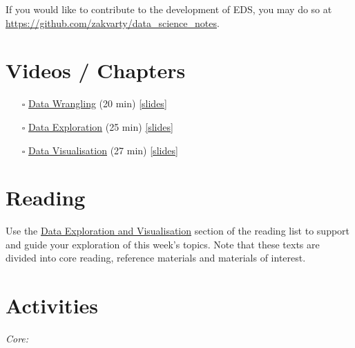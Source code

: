 \documentclass[
  12pt,
]{book}
\begin{document}
If you would like to contribute to the development of EDS, you may do so at \url{https://github.com/zakvarty/data_science_notes}.

\hypertarget{videos-chapters-2}{%
\section{Videos / Chapters}\label{videos-chapters-2}}

\begin{itemize}
\item[$\square$]
  \href{https://imperial.cloud.panopto.eu/Panopto/Pages/Viewer.aspx?id=b25a6d35-1e91-4090-b4f8-af9600b39086}{Data Wrangling} (20 min) \href{https://github.com/zakvarty/effective-data-science-slides-2022/raw/main/03-01-data-wrangling/03-01-data-wrangling.pdf}{{[}slides{]}}
\item[$\square$]
  \href{https://imperial.cloud.panopto.eu/Panopto/Pages/Viewer.aspx?id=a986f50c-90fe-4379-b4a1-af9600ba22fd}{Data Exploration} (25 min) \href{https://github.com/zakvarty/effective-data-science-slides-2022/raw/main/03-02-eda/03-02-data-exploration.pdf}{{[}slides{]}}
\item[$\square$]
  \href{https://imperial.cloud.panopto.eu/Panopto/Pages/Viewer.aspx?id=2ebbfa94-0b5d-45e9-b708-af8100d9664a}{Data Visualisation} (27 min) \href{https://github.com/zakvarty/effective-data-science-slides-2022/raw/main/03-03-data-visualisation/03-03-data-visualisation.pdf}{{[}slides{]}}
\end{itemize}

\hypertarget{reading-2}{%
\section{Reading}\label{reading-2}}

Use the \protect\hyperlink{edav-reading}{Data Exploration and Visualisation} section of the reading list to support and guide your exploration of this week's topics. Note that these texts are divided into core reading, reference materials and materials of interest.

\hypertarget{activities}{%
\section{Activities}\label{activities}}

\emph{Core:}
\end{document}

